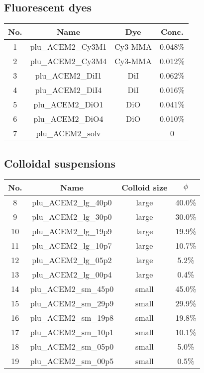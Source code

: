 \subsection{Fluorescent dyes}\label{fluorescent-dyes}
\begin{center}
\begin{tabular}{c|c|c|c}
No. & Name & Dye & Conc. \\
\hline
1 & plu\_ACEM2\_Cy3M1 & Cy3-MMA & 0.048\%\\
2 & plu\_ACEM2\_Cy3M4 & Cy3-MMA & 0.012\%\\
3 & plu\_ACEM2\_DiI1 & DiI & 0.062\%\\
4 & plu\_ACEM2\_DiI4 & DiI & 0.016\%\\
5 & plu\_ACEM2\_DiO1 & DiO & 0.041\%\\
6 & plu\_ACEM2\_DiO4 & DiO & 0.010\%\\
7 & plu\_ACEM2\_solv &  & 0\\
\end{tabular}
\end{center}

\subsection{Colloidal suspensions}\label{colloidal-suspensions}
\begin{center}
\begin{tabular}{c|c|c|c}
No. & Name & Colloid size & $\phi$\\
\hline
8 & plu\_ACEM2\_lg\_40p0 & large & 40.0\%\\
9 & plu\_ACEM2\_lg\_30p0 & large & 30.0\%\\
10 & plu\_ACEM2\_lg\_19p9 & large & 19.9\%\\
11 & plu\_ACEM2\_lg\_10p7 & large & 10.7\%\\
12 & plu\_ACEM2\_lg\_05p2 & large & 5.2\%\\
13 & plu\_ACEM2\_lg\_00p4 & large & 0.4\%\\
\hline
14 & plu\_ACEM2\_sm\_45p0 & small & 45.0\%\\
15 & plu\_ACEM2\_sm\_29p9 & small & 29.9\%\\
16 & plu\_ACEM2\_sm\_19p8 & small & 19.8\%\\
17 & plu\_ACEM2\_sm\_10p1 & small & 10.1\%\\
18 & plu\_ACEM2\_sm\_05p0 & small & 5.0\%\\
19 & plu\_ACEM2\_sm\_00p5 & small & 0.5\%\\
\end{tabular}
\end{center}

